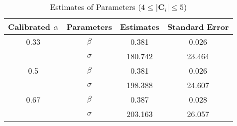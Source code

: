\begin{table}[H]
\centering
\caption{Estimates of Parameters ($4 \leq |\mathbf{C}_i| \leq 5$)}
\label{table: estimates (min_size=4 max_size=5 margin=2000)}
\begin{tabular}{cccc}
\toprule
Calibrated $\alpha$ & Parameters & Estimates & Standard Error \\
\midrule
0.33 & $\beta$ & 0.381 & 0.026 \\
 & $\sigma$ & 180.742 & 23.464 \\
0.5 & $\beta$ & 0.381 & 0.026 \\
 & $\sigma$ & 198.388 & 24.607 \\
0.67 & $\beta$ & 0.387 & 0.028 \\
 & $\sigma$ & 203.163 & 26.057 \\
\bottomrule
\end{tabular}
\end{table}
